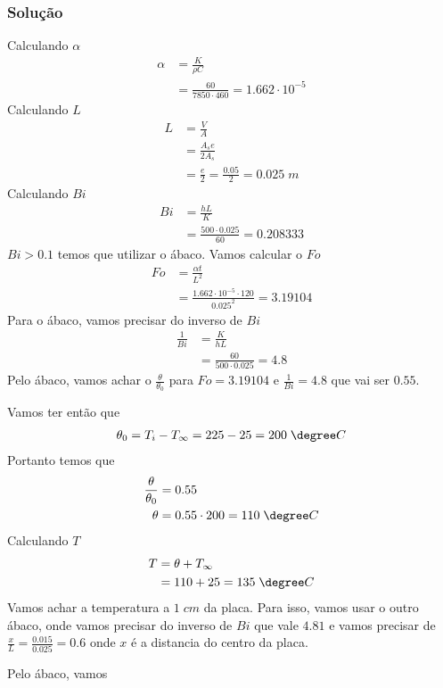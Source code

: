 \subsubsection{Solução}
Calculando \(\alpha \) 
\begin{align}
    \alpha &= \frac{K}{\rho C}\\
    &= \frac{60}{7850 \cdot 460}  = 1.662 \cdot 10^{-5}
\end{align}
Calculando \(L\)
\begin{align}
    L &= \frac{V}{A}\\
    &= \frac{A_{s} e}{2A_{s} }\\
    &= \frac{e}{2} = \frac{0.05}{2} = 0.025 \; m
\end{align}
Calculando \(Bi\)
\begin{align}
    Bi &= \frac{h L}{K}\\
    &= \frac{500 \cdot 0.025}{60}  = 0.208333
\end{align}
\(Bi > 0.1\) temos que utilizar o ábaco. Vamos calcular o \(Fo\)
\begin{align}
    Fo &= \frac{\alpha t}{L^{2} }\\
    &= \frac{1.662 \cdot 10^{-5} \cdot 120}{0.025^{2} } = 3.19104
\end{align}
Para o ábaco, vamos precisar do inverso de \(Bi\)
\begin{align}
    \frac{1}{Bi} &= \frac{K}{h L}\\
    &= \frac{60}{500 \cdot 0.025} = 4.8
\end{align}
Pelo ábaco, vamos achar o \(\frac{\theta}{\theta _0}\) para \(Fo = 3.19104\) e \(\frac{1}{Bi} =
4.8\) que vai ser \(0.55\). \par
Vamos ter então que
\begin{align}
    \theta_0 = T_i - T_\infty = 225 - 25 = 200 \; \degree C
\end{align}
Portanto temos que
\begin{align}
    \frac{\theta}{\theta _0} &= 0.55\\
    \theta &= 0.55 \cdot 200 = 110 \; \degree C
\end{align}
Calculando \(T\)
\begin{align}
    T &= \theta + T_\infty \\
    &= 110 + 25 = 135 \; \degree C
\end{align}
Vamos achar a temperatura a \(1 \; cm\) da placa. Para isso, vamos usar o outro ábaco, onde vamos
precisar do inverso de \(Bi\) que vale \(4.81\) e vamos precisar de \(\frac{x}{L} =
\frac{0.015}{0.025} = 0.6\) onde \(x\) é a distancia do centro da placa. \par Pelo ábaco, vamos
